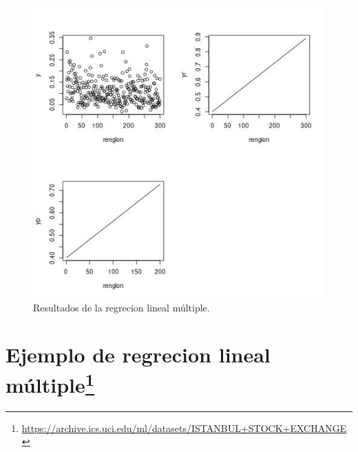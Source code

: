 \documentclass[12pt]{article}
\begin{document}
\begin{figure}[htbp]
\centering
\includegraphics[width=.9\linewidth]{img/rp2.jpeg}
\caption{Resultados de la regrecion lineal múltiple.}
\end{figure}

\section*{Ejemplo de regrecion lineal múltiple\footnote{\url{https://archive.ics.uci.edu/ml/datasets/ISTANBUL+STOCK+EXCHANGE}}}
\label{sec:orgec82897}

\end{document}
